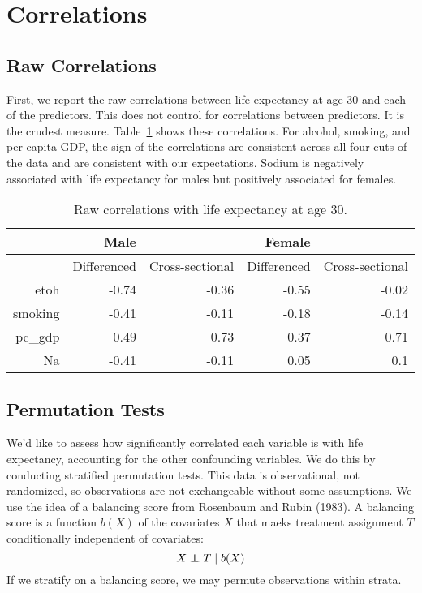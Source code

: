 \documentclass[11pt]{article}\usepackage[]{graphicx}\usepackage[]{color}
\newcommand\independent{\protect\mathpalette{\protect\independenT}{\perp}}
\def\independenT#1#2{\mathrel{\rlap{$#1#2$}\mkern2mu{#1#2}}}
\begin{document}
\section{Correlations}
\subsection{Raw Correlations}
First, we report the raw correlations between life expectancy at age 30 and each of the predictors.
This does not control for correlations between predictors.
It is the crudest measure.
Table~\ref{tab:raw_corr} shows these correlations.
For alcohol, smoking, and per capita GDP, the sign of the correlations are consistent across all four cuts of the data and are consistent with our expectations.
Sodium is negatively associated with life expectancy for males but positively associated for females.

\begin{table}[ht]
\centering
\begin{tabular}{r|rr|rr}
   \hline
 & Male &  & Female &  \\ 
   \hline
   & Differenced & Cross-sectional & Differenced & Cross-sectional \\ 
   \hline
etoh & -0.74 & -0.36 & -0.55 & -0.02 \\ 
  smoking & -0.41 & -0.11 & -0.18 & -0.14 \\ 
  pc\_gdp & 0.49 & 0.73 & 0.37 & 0.71 \\ 
  Na & -0.41 & -0.11 & 0.05 & 0.1 \\ 
   \hline
\end{tabular}
\caption{Raw correlations with life expectancy at age 30.} 
\label{tab:raw_corr}
\end{table}


\subsection{Permutation Tests}
We'd like to assess how significantly correlated each variable is with life expectancy, accounting for the other confounding variables.
We do this by conducting stratified permutation tests.
This data is observational, not randomized, so observations are not exchangeable without some assumptions.
We use the idea of a balancing score from Rosenbaum and Rubin (1983).
A balancing score is a function $b(X)$ of the covariates $X$ that maeks treatment assignment $T$ conditionally independent of covariates:
$$X \independent T \mid b(X)$$
If we stratify on a balancing score, we may permute observations within strata.
\end{document}
